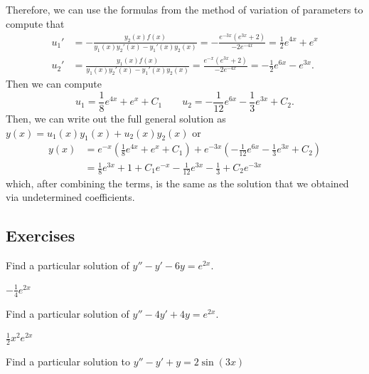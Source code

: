 \begin{exampleSol}
Therefore, we can use the formulas from the method of variation of parameters to compute that
\begin{equation*}
\begin{split}
u_1' &= -\frac{y_2(x)f(x)}{y_1(x)y_2'(x) - y_1'(x)y_2(x)} = -\frac{e^{-3x}(e^{3x} + 2)}{-2e^{-4x}} = \frac{1}{2}e^{4x} + e^x \\
u_2' &= \frac{y_1(x)f(x)}{y_1(x)y_2'(x) - y_1'(x)y_2(x)} = \frac{e^{-x}(e^{3x} + 2)}{-2e^{-4x}} = -\frac{1}{2}e^{6x} - e^{3x}.
\end{split}
\end{equation*} 
Then we can compute
\begin{equation*}
u_1 = \frac{1}{8}e^{4x} + e^x + C_1 \qquad u_2 = -\frac{1}{12}e^{6x} - \frac{1}{3}e^{3x} + C_2.
\end{equation*}
Then, we can write out the full general solution as $y(x) = u_1(x)y_1(x) + u_2(x)y_2(x)$ or
\begin{equation*}
\begin{split}
y(x) &= e^{-x}\left( \frac{1}{8}e^{4x} + e^x + C_1 \right) + e^{-3x}\left(-\frac{1}{12}e^{6x} - \frac{1}{3}e^{3x} + C_2 \right) \\
&= \frac{1}{8}e^{3x} + 1 + C_1e^{-x} - \frac{1}{12}e^{3x} - \frac{1}{3} + C_2e^{-3x}
\end{split}
\end{equation*}
which, after combining the terms, is the same as the solution that we obtained via undetermined coefficients.
\end{exampleSol}

\subsection{Exercises}

\begin{exercise}
Find a particular solution of
$y''-y' -6y = e^{2x}$.
\end{exercise}
\comboSol{%
}
{%
$-\frac{1}{4}e^{2x}$%
}

\begin{exercise}
Find a particular solution of
$y''-4y' +4y = e^{2x}$.
\end{exercise}
\comboSol{%
}
{%
$\frac{1}{2}x^2e^{2x}$%
}

\begin{exercise}\ansMark%
Find a particular solution to $y''-y'+y=2\sin(3x)$
\end{exercise}

